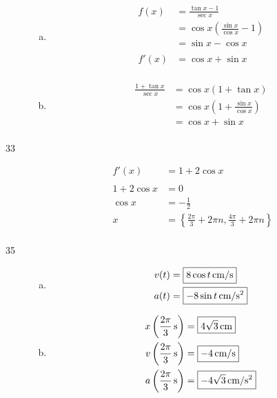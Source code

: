 \documentclass[letterpaper, landscape]{exam}
\begin{document}
\begin{description}
\begin{enumerate}[(a)]
        \item
          \begin{align*}
            f(x)  & = \frac{\tan x - 1}{\sec x} \\
                  & = \cos x \left( \frac{\sin x}{\cos x} - 1 \right) \\
                  & = \sin x - \cos x \\
            \\
            f'(x) & = \cos x + \sin x \\
          \end{align*}

        \item
          \begin{align*}
            \frac{1 + \tan x}{\sec x} & = \cos x (1 + \tan x) \\
                                      & = \cos x \left( 1 + \frac{\sin x}{\cos x} \right) \\
                                      & = \cos x + \sin x \\
          \end{align*}
      \end{enumerate}

    \item[33] 
      \begin{align*}
        f'(x)        & = 1 + 2 \cos x \\
        \\
        1 + 2 \cos x & = 0 \\
        \cos x       & = - \frac{1}{2} \\
        x            & = \boxed{ \left\{ \frac{2 \pi}{3} + 2 \pi n, \frac{4 \pi}{3} + 2 \pi n \right\} } \\
      \end{align*}

    \item[35] 
      \begin{enumerate}[(a)]
        \item 
          \begin{align*}
            v(t)   & = \boxed{ \unit[8 \cos t]{cm/s} } \\
            a(t)   & = \boxed{ \unit[- 8 \sin t]{cm/s^2} } \\
          \end{align*}

        \item 
          \begin{align*}
            x \left(\unit[\frac{2 \pi}{3}]{s} \right) & = \boxed{ \unit[4 \sqrt{3}]{cm} } \\
            v \left(\unit[\frac{2 \pi}{3}]{s} \right) & = \boxed{ \unit[-4]{cm/s} } \\
            a \left(\unit[\frac{2 \pi}{3}]{s} \right) & = \boxed{ \unit[- 4 \sqrt{3}]{cm/s^2} } \\
          \end{align*}


\end{enumerate}
\end{description}
\end{document}

